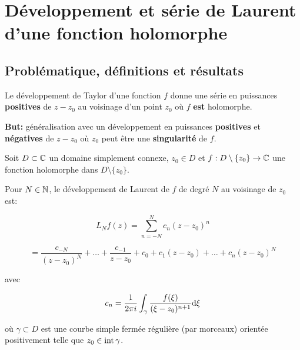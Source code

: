 \section{Développement et série de Laurent d'une fonction holomorphe}

\subsection{Problématique, définitions et résultats}


\begin{motivation}\hfill
    
    Le développement de Taylor d'une fonction $f$ donne une série en puissances \textbf{positives} de $z - z_0$ au voisinage d'un point $z_0$ où $f$ \textbf{est} holomorphe.
    
    \textbf{But:} généralisation avec un développement en puissances \textbf{positives} et \textbf{négatives} de $z - z_0$ où $z_0$ peut être une \textbf{singularité} de $f$.
\end{motivation}


\begin{hypothesis}\hfill
    
    Soit $D \subset \mathbb{C}$ un domaine simplement connexe, $z_0 \in D$ et $f: D \setminus \{z_0\} \rightarrow \mathbb{C}$ une fonction holomorphe dans $D \setminus \{z_0\}$.
\end{hypothesis}

\begin{definition}[11.1, p.78]
    Pour $N \in \mathbb{N}$, le développement de Laurent de $f$ de degré $N$ au voisinage de $z_0$ est:
    
    \[ L_N f(z) = \sum_{n = -N}^{N} c_n (z - z_0)^n \]
    
    \[ = \frac{c_ {-N}}{(z - z_0)^N} + \ldots + \frac{c_ {-1}}{z - z_0} + c_0 + c_1 (z - z_0) + \ldots + c_n (z - z_0)^N \]
    
    avec
    
    \[ c_n = \frac{1}{2 \pi i} \int_\gamma \frac{f(\xi)}{(\xi - z_0)^{n + 1}} \mathrm{d}\xi \]
    
    où $\gamma \subset D$ est une courbe simple fermée régulière (par morceaux) orientée positivement telle que $z_0 \in \textrm{int}\, \gamma$.
\end{definition}

